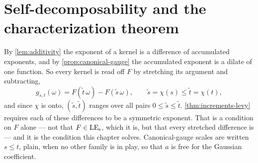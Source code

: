 %
%
%
%

\chapter{Self-decomposability and the characterization theorem}
\label{ch:characterization}

By \ref{lem:additivity} the exponent of a kernel is a difference of accumulated exponents,
and by \ref{prop:canonical-gauge} the accumulated exponent is a dilate of one function. So
every kernel is read off $F$ by stretching its argument and subtracting,
\[
  g_{s,t}(\omega) = F(\tilde t\,\omega) - F(\tilde s\,\omega),
  \qquad \tilde s = \chi(s) \le \tilde t = \chi(t),
\]
and since $\chi$ is onto, $(\tilde s,\tilde t)$ ranges over all pairs $0 \le \tilde s \le
\tilde t$. \ref{thm:increments-levy} requires each of these differences to be a symmetric \Levy{}
exponent. That is a condition on $F$ alone --- not that $F \in \mathrm{LE}_{\mathrm{s}}$, which it is, but that
every stretched difference is --- and it is the condition this chapter solves. Canonical-gauge
scales are written $s \le t$, plain, when no other family is in play, so that $a$ is free for
the Gaussian coefficient.


